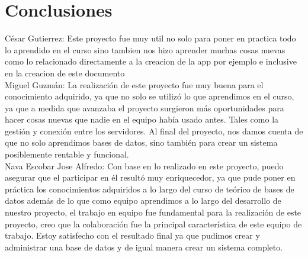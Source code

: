 \documentclass{article}
\begin{document}
\pagebreak

\section{Conclusiones}
César Gutierrez: Este proyecto fue muy util no solo para poner en practica todo lo aprendido en el curso sino tambien nos hizo aprender muchas cosas nuevas como lo relacionado directamente a la creacion de la app por ejemplo e inclusive en la creacion de este documento\\ 

Miguel Guzmán: La realización de este proyecto fue muy buena para el conocimiento adquirido, ya que no solo se utilizó lo que aprendimos en el curso, ya que a medida que avanzaba el proyecto surgieron más oportunidades para hacer cosas nuevas que nadie en el equipo había usado antes. Tales como la gestión y conexión entre los servidores. Al final del proyecto, nos damos cuenta de que no solo aprendimos bases de datos, sino también para crear un sistema posiblemente rentable y funcional.\\

Nava Escobar Jose Alfredo: Con base en lo realizado en este proyecto, puedo asegurar que el participar en él resultó muy enriquecedor, ya que pude poner en práctica los conocimientos adquiridos a lo largo del curso de teórico de bases de datos además de lo que como equipo aprendimos a lo largo del desarrollo de nuestro proyecto, el trabajo en equipo fue fundamental para la realización de este proyecto, creo que la colaboración fue la principal característica de este equipo de trabajo. Estoy satisfecho con el resultado final ya que pudimos crear y administrar una base de datos y de igual manera crear un sistema completo.\\
\end{document}
